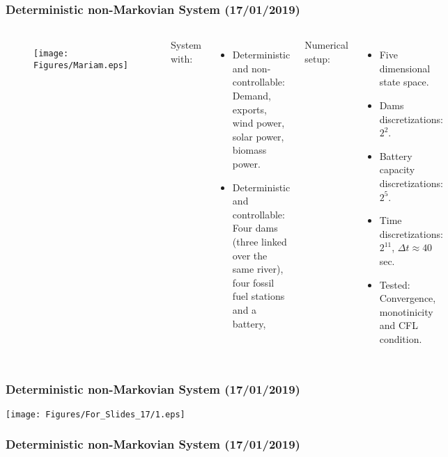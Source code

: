 
\begin{frame}
\frametitle{Deterministic non-Markovian System (17/01/2019)}

\begin{columns}[c]

\begin{figure}[ht!]
\centering
\texttt{[image: Figures/Mariam.eps]}
\end{figure}

System with:
\begin{itemize}
\item Deterministic and non-controllable: Demand, exports, wind power, solar power, biomass power.
\item Deterministic and controllable: Four dams (three linked over the same river), four fossil fuel stations and a battery,
\end{itemize}
Numerical setup:
\begin{itemize}
\item Five dimensional state space.
\item Dams discretizations: $2^2$.
\item Battery capacity discretizations: $2^5$.
\item Time discretizations: $2^{11}$, $\Delta t\approx 40$ sec.
\item Tested: Convergence, monotinicity and CFL condition.
\end{itemize}

\end{columns}
\end{frame}


\begin{frame}
\frametitle{Deterministic non-Markovian System (17/01/2019)}
\texttt{[image: Figures/For\_Slides\_17/1.eps]}
\end{frame}


\begin{frame}
\frametitle{Deterministic non-Markovian System (17/01/2019)}
\begin{figure}[ht!]
\centering
{}\quad
{}
\end{figure}
\end{frame}

